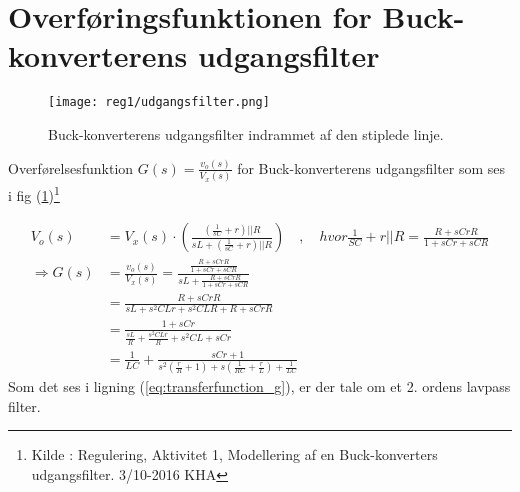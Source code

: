 \section{Overføringsfunktionen for Buck-konverterens udgangsfilter}\label{sec:spm1}
\begin{figure}[h!]
	\centering
	\texttt{[image: reg1/udgangsfilter.png]}
	\caption{Buck-konverterens udgangsfilter indrammet af den stiplede linje.}
	\label{fig:udgangsfilter}
\end{figure}
\FloatBlock

Overførelsesfunktion $G(s) = \frac{v_o(s)}{V_x(s)}$ for Buck-konverterens udgangsfilter som ses i fig (\ref{fig:udgangsfilter})\footnote{Kilde : Regulering, Aktivitet 1, Modellering af en Buck-konverters udgangsfilter. 3/10-2016 KHA}

\begin{align}
V_o(s) &= V_x(s) \cdot \left( \frac{\left(\frac{1}{sC} + r \right) || R }{sL + \left(\frac{1}{sC} + r \right) || R}  \right) 
\quad, \quad hvor \frac{1}{SC} + r || R = \frac{R+sCrR}{1+sCr+sCR} \\
\Rightarrow G(s) &= \frac{v_o(s)}{V_x(s)} = \frac{ \frac{R+sCrR}{1+sCr+sCR}}{sL +  \frac{R+sCrR}{1+sCr+sCR}} \\
&= \frac{R+sCrR}{sL+s^2CLr+s^2CLR+R+sCrR}\\
&= \frac{1+sCr}{\frac{sL}{R}+\frac{s^2CLr}{R}+s^2CL+sCr}\\
&= \frac{1}{LC} + \frac{sCr+1}{s^2\left(\frac{r}{R}+1\right)+s\left(\frac{1}{RC}+\frac{r}{L}\right)+\frac{1}{LC}} \label{eq:transferfunction_g}
\end{align}
Som det ses i ligning (\ref{eq:transferfunction_g}), er der tale om et 2. ordens lavpass filter.